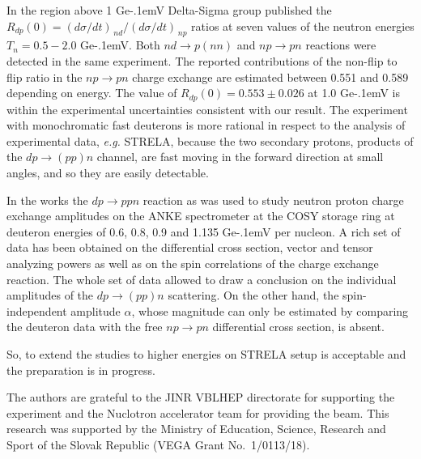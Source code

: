 \documentclass[twocolumn,epjc3]{svjour3}
\newcommand{\np}     {\ensuremath{np \rightarrow pn}\xspace}
\newcommand{\dpfrag} {\ensuremath{dp \rightarrow ppn}\xspace}
\newcommand{\dpchex} {\ensuremath{dp \rightarrow (pp)n}\xspace}
\newcommand{\GeV}    {Ge\kern-.1emV\xspace}
\begin{document}
In the region above 1 \GeV Delta-Sigma group published the
$R_{dp}(0) = (d\sigma/dt)_{\,nd} / (d\sigma/dt)_{\,np}$ ratios
\cite{sha09,sha09_2,shi11} at seven values of the neutron energies
$T_n = 0.5 - 2.0$ \GeV. Both $nd \rightarrow p(nn)$ and \np reactions were
detected in the same experiment. The reported contributions of the non-flip to
flip ratio in the \np charge exchange are estimated between 0.551 and 0.589
depending on energy. The value of $R_{dp}(0) = 0.553 \pm 0.026$ at 1.0 \GeV
\cite{sha09} is within the experimental uncertainties consistent with our
result. The experiment with monochromatic fast deuterons is more rational in
respect to the analysis of experimental data, \textit{e.g.} STRELA, because the
two secondary protons, products of the \dpchex channel, are fast moving in the
forward direction at small angles, and so they are easily detectable.

In the works \cite{chi09,mch13} the \dpfrag reaction as was used to study
neutron proton charge exchange amplitudes on the ANKE spectrometer at the COSY
storage ring at deuteron energies of 0.6, 0.8, 0.9 and 1.135 \GeV per nucleon.
A rich set of data has been obtained on the differential cross section, vector
and tensor analyzing powers as well as on the spin correlations of the charge
exchange reaction. The whole set of data allowed to draw a conclusion on the
individual amplitudes of the \dpchex scattering. On the other hand, the
spin-independent amplitude $\alpha$, whose magnitude can only be estimated by
comparing the deuteron data with the free \np differential cross section, is
absent.

So, to extend the studies to higher energies on STRELA setup is acceptable and
the preparation is in progress.

\begin{acknowledgements}
  The authors are grateful to the JINR VBLHEP directorate for supporting the
  experiment and the Nuclotron accelerator team for providing the beam. This
  research was supported by the Ministry of Education, Science, Research and
  Sport of the Slovak Republic (VEGA Grant No.~1/0113/18).
\end{acknowledgements}

\end{document}
